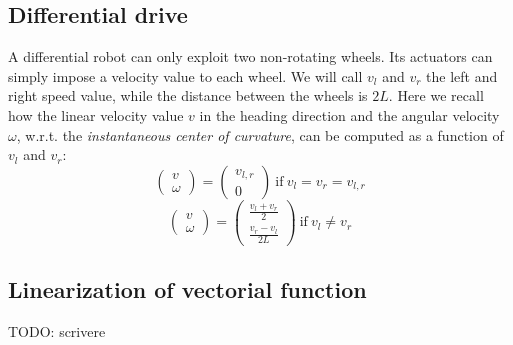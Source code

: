 	\subsection{Differential drive}
		\label{app.differential_drive}
	
		A differential robot can only exploit two non-rotating wheels. 
		Its actuators can simply impose a velocity value to each wheel. 
		We will call $v_l$ and $v_r$ the left and right speed value, while the distance between the wheels is $2L$.
		Here we recall how the linear velocity value $v$ in the heading direction and the angular velocity $\omega$, w.r.t. the \emph{instantaneous center of curvature}, can be computed as a function of $v_l$ and $v_r$:
		\begin{equation}
			\left(\begin{array}{c}
				v \\ \omega
			\end{array}\right)
			=
			\left(\begin{array}{c}
				v_{l,r} \\ 0
			\end{array}\right)
			\ \mathrm{if} \ v_l = v_r = v_{l,r}
		\end{equation}
		\begin{equation}
			\left(\begin{array}{c}
				v \\ 
				\omega
			\end{array}\right)
			=
			\left(\begin{array}{c}
				\frac{v_l + v_r}{2} \\ 
				\frac{v_r - v_l}{2L}
			\end{array}\right)
			\ \mathrm{if} \ v_l \neq v_r
		\end{equation}
		
	\subsection{Linearization of vectorial function}
		\label{app.differential_drive}
		TODO: scrivere
